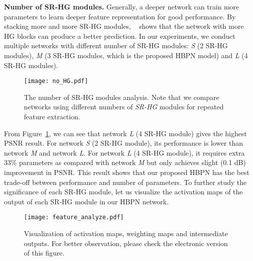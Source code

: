 \documentclass[10pt,twocolumn,letterpaper]{article}
\begin{document}
\textbf{Number of SR-HG modules.} Generally, a deeper network can train more parameters to learn deeper feature representation for good performance. By stacking more and more SR-HG modules, ~\cite{DBPN} shows that the network with more HG blocks can produce a better prediction. In our experiments, we conduct multiple networks with different number of SR-HG modules: \textit{S} (2 SR-HG modules), \textit{M} (3 SR-HG modules, which is the proposed HBPN model) and \textit{L} (4 SR-HG modules). 

\begin{figure}[t]
\vskip 0.01in
\begin{center}
\centerline{\texttt{[image: no\_HG.pdf]}}
\caption{The number of SR-HG modules analysis. Note that we compare networks using different numbers of \textit{SR-HG} modules for repeated feature extraction.}
\label{Figure 7}
\end{center}
\vskip -0.3in
\end{figure}

From Figure~\ref{Figure 7}, we can see that network \textit{L} (4 SR-HG module) gives the highest PSNR result. For network \textit{S} (2 SR-HG module), its performance is lower than network \textit{M} and network \textit{L}. For network \textit{L} (4 SR-HG module), it requires extra 33\% parameters as compared with network \textit{M} but only achieves slight (0.1 dB) improvement in PSNR. This result shows that our proposed HBPN has the best trade-off between performance and number of parameters. To further study the significance of each SR-HG module, let us visualize the activation maps of the output of each SR-HG module in our HBPN network. 

\begin{figure}[htb]
\vskip 0.01in
\begin{center}
\centerline{\texttt{[image: feature\_analyze.pdf]}}
\caption{Visualization of activation maps, weighting maps and intermediate outputs. For better observation, please check the electronic version of this figure.}
\label{Figure 8}
\end{center}
\vskip -0.5in
\end{figure}
\end{document}
